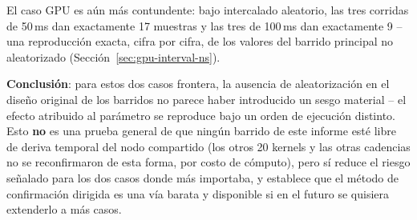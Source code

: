 El caso GPU es aún más contundente: bajo intercalado aleatorio, las tres
corridas de 50\,ms dan exactamente 17 muestras y las tres de 100\,ms dan
exactamente 9 -- una reproducción exacta, cifra por cifra, de los valores
del barrido principal no aleatorizado (Sección~\ref{sec:gpu-interval-ns}).

\textbf{Conclusión}: para estos dos casos frontera, la ausencia de
aleatorización en el diseño original de los barridos no parece haber
introducido un sesgo material -- el efecto atribuido al parámetro se
reproduce bajo un orden de ejecución distinto. Esto \textbf{no} es una
prueba general de que ningún barrido de este informe esté libre de deriva
temporal del nodo compartido (los otros 20 kernels y las otras cadencias no
se reconfirmaron de esta forma, por costo de cómputo), pero sí reduce el
riesgo señalado para los dos casos donde más importaba, y establece que el
método de confirmación dirigida es una vía barata y disponible si en el
futuro se quisiera extenderlo a más casos.